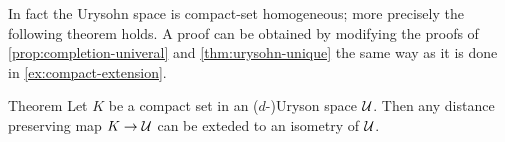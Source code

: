 In fact the Urysohn space is compact-set homogeneous; more precisely the following theorem holds.
A proof can be obtained by modifying the proofs of \ref{prop:completion-univeral} and \ref{thm:urysohn-unique}
the same way as it is done in \ref{ex:compact-extension}.

\begin{thm}{Theorem}\label{thm:compact-homogeneous}
Let $K$ be a compact set in an ($d$-)Uryson space $\mathcal{U}$.
Then any distance preserving map $K\to \mathcal{U}$ can be exteded to an isometry of $\mathcal{U}$.
\end{thm}











